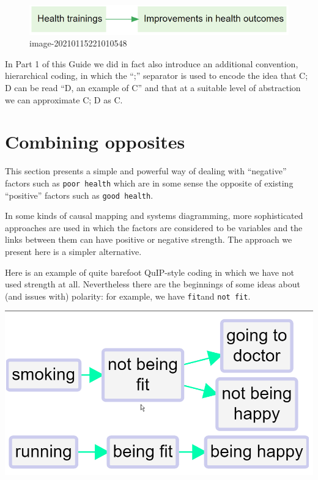 \documentclass[
]{book}
\begin{document}
\begin{figure}
\centering
\includegraphics{_assets/image-20210115221010548.png}
\caption{image-20210115221010548}
\end{figure}

In Part 1 of this Guide we did in fact also introduce an additional convention, hierarchical coding, in which the ``;'' separator is used to encode the idea that C; D can be read ``D, an example of C'' and that at a suitable level of abstraction we can approximate C; D as C.

\hypertarget{combining-opposites}{%
\section{Combining opposites}\label{combining-opposites}}

This section presents a simple and powerful way of dealing with ``negative'' factors such as \texttt{poor\ health} which are in some sense the opposite of existing ``positive'' factors such as \texttt{good\ health}.

In some kinds of causal mapping and systems diagramming, more sophisticated approaches are used in which the factors are considered to be variables and the links between them can have positive or negative strength. The approach we present here is a simpler alternative.

Here is an example of quite barefoot QuIP-style coding in which we have not used strength at all. Nevertheless there are the beginnings of some ideas about (and issues with) polarity: for example, we have \texttt{fit}and \texttt{not\ fit}.

\includegraphics{_assets/121006.png}
\end{document}
